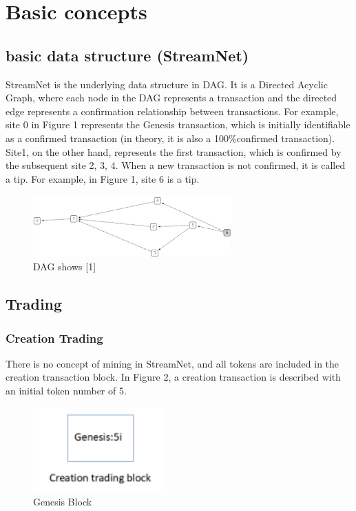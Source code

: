 \section{Basic concepts}
\subsection{basic data structure (StreamNet)}
StreamNet is the underlying data structure in DAG. It is a Directed Acyclic Graph, where each node in the DAG represents a transaction and the directed edge represents a confirmation relationship between transactions. For example, site 0 in Figure 1 represents the Genesis transaction, which is initially identifiable as a confirmed transaction (in theory, it is also a 100\%confirmed transaction). Site1, on the other hand, represents the first transaction, which is confirmed by the subsequent site 2, 3, 4. When a new transaction is not confirmed, it is called a tip. For example, in Figure 1, site 6 is a tip.


\begin{figure}[H]
	\centering
	\includegraphics[width=3.0in]{figures/screenshot001.png}
	\caption{DAG shows [1]}
	\label{simulationfigure}
\end{figure}

\subsection{Trading}
\subsubsection{Creation Trading}
There is no concept of mining in StreamNet, and all tokens are included in the creation transaction block. In Figure 2, a creation transaction is described with an initial token number of 5.

\begin{figure}[H]
	\centering
	\includegraphics[width=2.0in]{figures/screenshot002.png}
	\caption{Genesis Block}
	\label{simulationfigure}
\end{figure}

